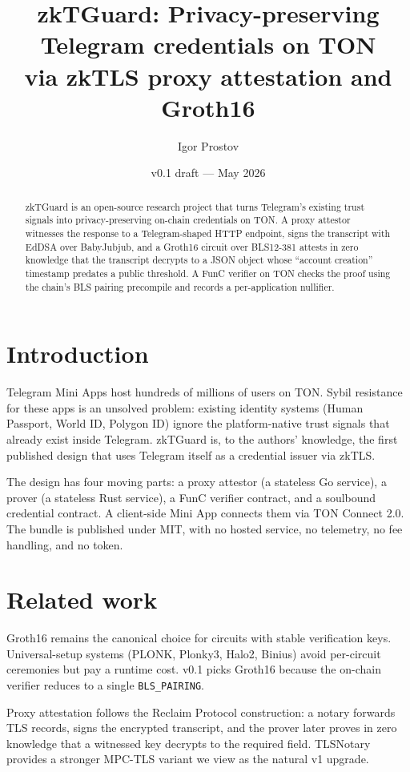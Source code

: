 \documentclass[11pt,a4paper]{article}
\title{zkTGuard: Privacy-preserving Telegram credentials on TON \\
       \large via zkTLS proxy attestation and Groth16}
\author{Igor Prostov}
\date{v0.1 draft --- May 2026}
\begin{document}
\maketitle

\begin{abstract}
zkTGuard is an open-source research project that turns Telegram's
existing trust signals into privacy-preserving on-chain credentials
on TON. A proxy attestor witnesses the response to a Telegram-shaped
HTTP endpoint, signs the transcript with EdDSA over BabyJubjub, and a
Groth16 circuit over BLS12-381 attests in zero knowledge that the
transcript decrypts to a JSON object whose ``account creation''
timestamp predates a public threshold. A FunC verifier on TON checks
the proof using the chain's BLS pairing precompile and records a
per-application nullifier.
\end{abstract}

\section{Introduction}\label{sec:intro}

Telegram Mini Apps host hundreds of millions of users on TON. Sybil
resistance for these apps is an unsolved problem: existing identity
systems (Human Passport, World ID, Polygon ID) ignore the
platform-native trust signals that already exist inside Telegram.
zkTGuard is, to the authors' knowledge, the first published design
that uses Telegram itself as a credential issuer via zkTLS.

The design has four moving parts: a proxy attestor (a stateless Go
service), a prover (a stateless Rust service), a FunC verifier
contract, and a soulbound credential contract. A client-side Mini App
connects them via TON Connect 2.0. The bundle is published under MIT,
with no hosted service, no telemetry, no fee handling, and no token.

\section{Related work}\label{sec:related}

Groth16 remains the canonical choice for circuits with stable
verification keys. Universal-setup systems (PLONK, Plonky3, Halo2,
Binius) avoid per-circuit ceremonies but pay a runtime cost. v0.1
picks Groth16 because the on-chain verifier reduces to a single
\texttt{BLS\_PAIRING}.

Proxy attestation follows the Reclaim Protocol construction: a notary
forwards TLS records, signs the encrypted transcript, and the prover
later proves in zero knowledge that a witnessed key decrypts to the
required field. TLSNotary provides a stronger MPC-TLS variant we view
as the natural v1 upgrade.
\end{document}
